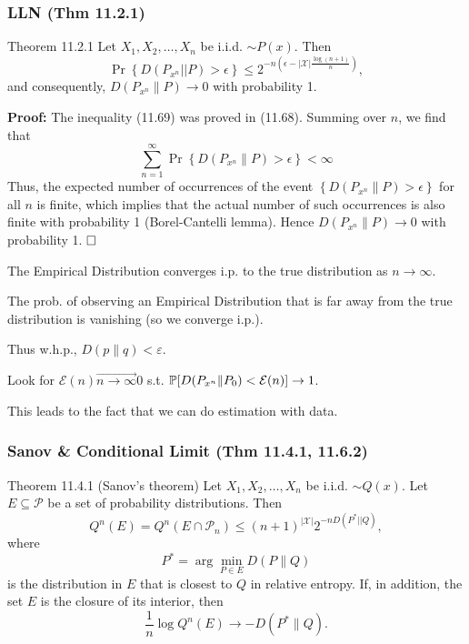 \newpage
\subsubsection{LLN (Thm 11.2.1)}
\begin{shaded}
Theorem 11.2.1 Let $X_1, X_2, \ldots, X_n$ be i.i.d. $\sim P(x)$. Then
$$
\operatorname{Pr}\left\{D\left(P_{x^n}|| P\right)>\epsilon\right\} \leq 2^{-n\left(\epsilon-|\mathcal{X}| \frac{\log (n+1)}{n}\right)},
$$
and consequently, $D\left(P_{x^n} \| P\right) \rightarrow 0$ with probability 1.
\end{shaded}

\begin{Answer}
\textbf{Proof:} The inequality (11.69) was proved in (11.68). Summing over $n$, we find that
$$
\sum_{n=1}^{\infty} \operatorname{Pr}\left\{D\left(P_{x^n} \| P\right)>\epsilon\right\}<\infty
$$
Thus, the expected number of occurrences of the event $\left\{D\left(P_{x^n} \| P\right)>\epsilon\right\}$ for all $n$ is finite, which implies that the actual number of such occurrences is also finite with probability 1 (Borel-Cantelli lemma). Hence $D\left(P_{x^n} \| P\right) \rightarrow 0$ with probability 1.
$\hfill\square$
\end{Answer}

The Empirical Distribution converges i.p. to the true distribution as $n\to\infty$.

The prob. of observing an Empirical Distribution that is far away from the true distribution is vanishing (so we converge i.p.).

Thus w.h.p., $D(p\|q)<\varepsilon$.

Look for $\mathcal{E}(n)\stackrel\to{n\to\infty}0$ s.t. $\P[D(P_{x^n} \| P_0) < \mathcal{E}(n)] \to 1$.

This leads to the fact that we can do estimation with data.

\newpage
\subsubsection{Sanov \& Conditional Limit (Thm 11.4.1, 11.6.2)}
\begin{shaded}
Theorem 11.4.1 (Sanov's theorem) Let $X_1, X_2, \ldots, X_n$ be i.i.d. $\sim Q(x)$. Let $E \subseteq \mathcal{P}$ be a set of probability distributions. Then
$$
Q^n(E)=Q^n\left(E \cap \mathcal{P}_n\right) \leq(n+1)^{|\mathcal{X}|} 2^{-n D\left(P^*|| Q\right)},
$$
where
$$
P^*=\arg \min _{P \in E} D(P \| Q)
$$
is the distribution in $E$ that is closest to $Q$ in relative entropy.
If, in addition, the set $E$ is the closure of its interior, then
$$
\frac{1}{n} \log Q^n(E) \rightarrow-D\left(P^* \| Q\right) .
$$
\end{shaded}

